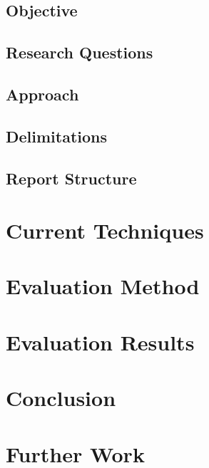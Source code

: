 \documentclass[a4paper]{report}
\begin{document}
\section{Objective}

\section{Research Questions}

\section{Approach}

\section{Delimitations}

\section{Report Structure}


\chapter{Current Techniques}


\chapter{Evaluation Method}


\chapter{Evaluation Results}


\chapter{Conclusion}


\chapter{Further Work}

\clearpage


\renewcommand\bibname{References}


\end{document}
